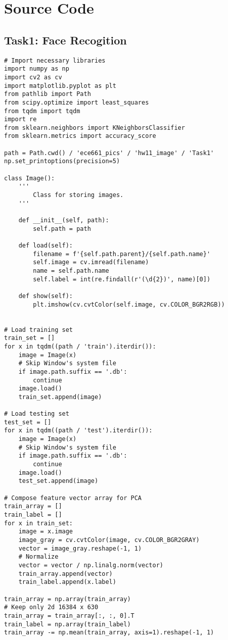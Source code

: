 \documentclass[11pt]{article}
\begin{document}
\newpage
\section*{Source Code}
\subsection*{Task1: Face Recogition}

\begin{lstlisting}
# Import necessary libraries
import numpy as np
import cv2 as cv
import matplotlib.pyplot as plt
from pathlib import Path
from scipy.optimize import least_squares
from tqdm import tqdm
import re
from sklearn.neighbors import KNeighborsClassifier
from sklearn.metrics import accuracy_score

path = Path.cwd() / 'ece661_pics' / 'hw11_image' / 'Task1'
np.set_printoptions(precision=5)

class Image():
    ''' 
        Class for storing images.
    '''
    
    def __init__(self, path):
        self.path = path   

    def load(self):
        filename = f'{self.path.parent}/{self.path.name}'
        self.image = cv.imread(filename)
        name = self.path.name
        self.label = int(re.findall(r'(\d{2})', name)[0])

    def show(self):
        plt.imshow(cv.cvtColor(self.image, cv.COLOR_BGR2RGB))
    

# Load training set
train_set = []
for x in tqdm((path / 'train').iterdir()):
    image = Image(x)
    # Skip Window's system file 
    if image.path.suffix == '.db':
        continue
    image.load()
    train_set.append(image)

# Load testing set
test_set = []
for x in tqdm((path / 'test').iterdir()):
    image = Image(x)
    # Skip Window's system file
    if image.path.suffix == '.db':
        continue
    image.load()
    test_set.append(image)

# Compose feature vector array for PCA
train_array = []
train_label = []
for x in train_set:
    image = x.image
    image_gray = cv.cvtColor(image, cv.COLOR_BGR2GRAY)
    vector = image_gray.reshape(-1, 1)
    # Normalize
    vector = vector / np.linalg.norm(vector)
    train_array.append(vector)
    train_label.append(x.label)
    
train_array = np.array(train_array)
# Keep only 2d 16384 x 630
train_array = train_array[:, :, 0].T
train_label = np.array(train_label)
train_array -= np.mean(train_array, axis=1).reshape(-1, 1)


\end{lstlisting}
\end{document}
